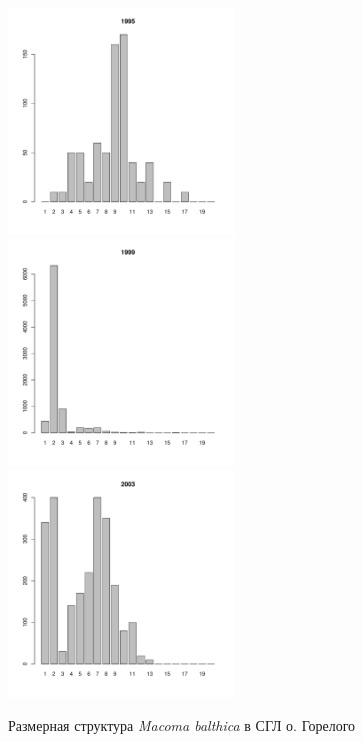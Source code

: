\begin{figure}[h]
\begin{multicols}{3}
\hfill
\includegraphics[width=60mm]{../White_Sea/Luvenga_Goreliy/middle_1995_.pdf}
\hfill
\includegraphics[width=60mm]{../White_Sea/Luvenga_Goreliy/middle_1999_.pdf}
\hfill
\includegraphics[width=60mm]{../White_Sea/Luvenga_Goreliy/middle_2003_.pdf}
\end{multicols}


\caption{Размерная структура {\it Macoma balthica} в СГЛ о. Горелого}
\label{ris:size_str_Goreliy_mid}
\end{figure}


